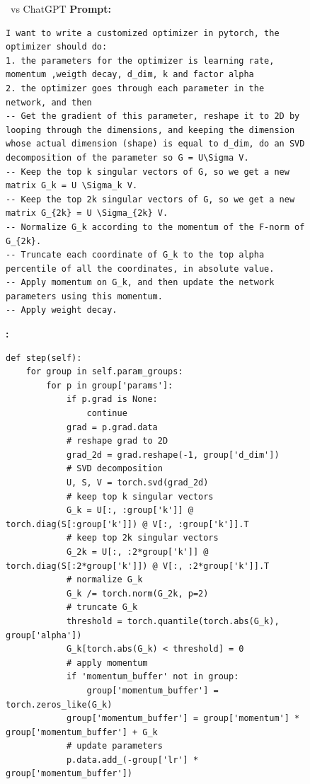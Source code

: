 \begin{figure}[H]
\begin{AIbox}{\DV~vs ChatGPT}
{\bf Prompt:}
\begin{verbatim}
I want to write a customized optimizer in pytorch, the optimizer should do:
1. the parameters for the optimizer is learning rate, momentum ,weigth decay, d_dim, k and factor alpha
2. the optimizer goes through each parameter in the network, and then
-- Get the gradient of this parameter, reshape it to 2D by looping through the dimensions, and keeping the dimension whose actual dimension (shape) is equal to d_dim, do an SVD decomposition of the parameter so G = U\Sigma V. 
-- Keep the top k singular vectors of G, so we get a new matrix G_k = U \Sigma_k V. 
-- Keep the top 2k singular vectors of G, so we get a new matrix G_{2k} = U \Sigma_{2k} V. 
-- Normalize G_k according to the momentum of the F-norm of G_{2k}.
-- Truncate each coordinate of G_k to the top alpha  percentile of all the coordinates, in absolute value.
-- Apply momentum on G_k, and then update the network parameters using this momentum.
-- Apply weight decay.
\end{verbatim}
\begin{minipage}[t]{0.5\linewidth}
{\bf \DV:}
\begin{verbatim}
def step(self):
    for group in self.param_groups:
        for p in group['params']:
            if p.grad is None:
                continue
            grad = p.grad.data
            # reshape grad to 2D
            grad_2d = grad.reshape(-1, group['d_dim'])
            # SVD decomposition
            U, S, V = torch.svd(grad_2d)
            # keep top k singular vectors
            G_k = U[:, :group['k']] @ torch.diag(S[:group['k']]) @ V[:, :group['k']].T
            # keep top 2k singular vectors
            G_2k = U[:, :2*group['k']] @ torch.diag(S[:2*group['k']]) @ V[:, :2*group['k']].T
            # normalize G_k 
            G_k /= torch.norm(G_2k, p=2)
            # truncate G_k 
            threshold = torch.quantile(torch.abs(G_k), group['alpha'])
            G_k[torch.abs(G_k) < threshold] = 0
            # apply momentum
            if 'momentum_buffer' not in group:
                group['momentum_buffer'] = torch.zeros_like(G_k)
            group['momentum_buffer'] = group['momentum'] * group['momentum_buffer'] + G_k 
            # update parameters
            p.data.add_(-group['lr'] * group['momentum_buffer'])

\end{verbatim}
\end{minipage}
\end{AIbox}
\end{figure}
